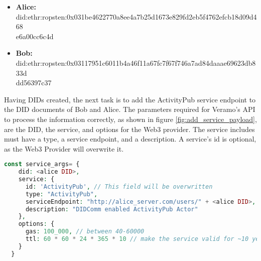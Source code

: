 \begin{itemize}
  \item \textbf{Alice:} 
  did:ethr:ropsten:0x031be4622770a8ee4a7b25d1673e829fd2eb5f4762efcb18d09d468\\e6a00cc6c4d
  \item \textbf{Bob:} 
did:ethr:ropsten:0x03117951c6011b4a46f11a67fc7f67f746a7ad84daaae69623db833d\\dd56397c37
\end{itemize}

Having DIDs created, the next task is to add the ActivityPub service endpoint to the DID documents of Bob and Alice. The parameters required for Veramo's API to process the information correctly, as shown in figure \ref{fig:add_service_payload}, are the DID, the service, and options for the Web3 provider. The service includes must have a type, a service endpoint, and a description. A service's id is optional, as the Web3 Provider will overwrite it. 

\lstset{style=JSONStyle}
\begin{lstlisting}[language=PHP, caption=Parameters to add a service in Veramo, label=fig:add_service_payload, float=h]
  const service_args= {
    did: <alice DID>,
    service: {
      id: 'ActivityPub', // This field will be overwritten
      type: "ActivityPub",
      serviceEndpoint: "http://alice_server.com/users/" + <alice DID>,
      description: "DIDComm enabled ActivityPub Actor"
    },
    options: {
      gas: 100_000, // between 40-60000
      ttl: 60 * 60 * 24 * 365 * 10 // make the service valid for ~10 years
    }
  }
\end{lstlisting}

